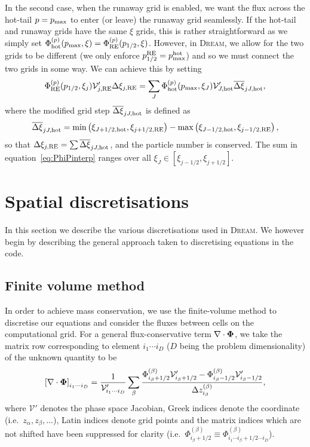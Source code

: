 \documentclass{notes}
\newcommand{\DREAM}{\textsc{Dream}}
\newcommand{\Vp}{\mathcal{V}'}
\begin{document}
    In the second case, when the runaway grid is enabled, we want the flux
    across the hot-tail $p=p_{\rm max}$ to enter (or leave) the runaway grid
    seamlessly. If the hot-tail and runaway grids have the same $\xi$ grids,
    this is rather straightforward as we simply set 
    $\Phi^{(p)}_{\rm hot}(p_{\rm max},\xi) = \Phi^{(p)}_{\rm RE}(p_{1/2},\xi)$.
    However, in \DREAM, we allow for the two grids to be different (we only
    enforce $p^{\rm RE}_{1/2} = p^{\rm hot}_{\rm max}$) and so we must connect
    the two grids in some way. We can achieve this by setting
    \begin{equation}\label{eq:fluxCross}
        \Phi^{(p)}_{\rm RE}(p_{1/2},\xi_j)\Vp_{j,\rm RE}\Delta\xi_{j,\rm RE} =
        \sum_{J} \Phi^{(p)}_{\rm hot}(p_{\rm max},\xi_J) \Vp_{J,\rm hot} \overline{\Delta\xi}_{jJ,\rm hot},
    \end{equation}
    where the modified grid step $\overline{\Delta\xi}_{jJ,\rm hot}$ is defined
    as
    \begin{equation}\label{eq:PhiPinterp}
        \overline{\Delta\xi}_{jJ,\rm hot} = \min\left(\xi_{J+1/2,{\rm hot}},\xi_{j+1/2,{\rm RE}}\right) -
        \max\left( \xi_{J-1/2,{\rm hot}}, \xi_{j-1/2,{\rm RE}} \right),
    \end{equation}
    so that $\Delta\xi_{j,\rm RE} = \sum\overline{\Delta\xi}_{jJ,\rm hot}$, and
    the particle number is conserved. The sum in equation~\eqref{eq:PhiPinterp}
    ranges over all $\xi_J\in [\xi_{j-1/2},\xi_{j+1/2}]$.

    \section{Spatial discretisations}
    In this section we describe the various discretisations used in \DREAM. We
    however begin by describing the general approach taken to discretising
    equations in the code.

    \subsection{Finite volume method}
    In order to achieve mass conservation, we use the finite-volume method to
    discretise our equations and consider the fluxes between cells on the
    computational grid. For a general flux-conservative term
    $\nabla\cdot\boldsymbol{\Phi}$, we take the matrix row corresponding to element
    $i_1\cdots i_D$ ($D$ being the problem dimensionality) of the unknown
    quantity to be
    \begin{equation}
        \left[ \nabla\cdot\bb{\Phi} \right]_{i_1\cdots i_D}  =
            \frac{1}{\Vp_{i_1\cdots i_D}}\sum_\beta \frac{
                \Phi^{(\beta)}_{i_\beta+1/2} \Vp_{i_\beta+1/2} -
                \Phi^{(\beta)}_{i_\beta-1/2} \Vp_{i_\beta-1/2}
            }{\Delta z^{(\beta)}_{i_\beta}},
    \end{equation}
    where $\Vp$ denotes the phase space Jacobian, Greek indices denote the
    coordinate (i.e.\ $z_\alpha, z_\beta, \ldots$), Latin indices denote grid
    points and the matrix indices which are not shifted have been suppressed for
    clarity (i.e.\
    $\Phi^{(\beta)}_{i_\beta+1/2}\equiv\Phi^{(\beta)}_{i_1\cdots i_\beta+1/2\cdots i_D}$).
\end{document}
